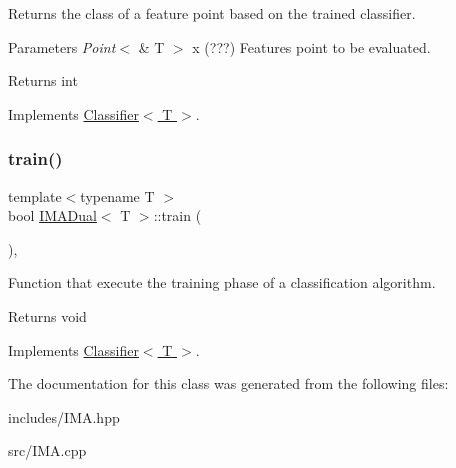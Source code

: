 Returns the class of a feature point based on the trained classifier. 


\begin{DoxyParams}{Parameters}
{\em Point$<$} & T $>$ x (???) Features point to be evaluated. \\
\hline
\end{DoxyParams}
\begin{DoxyReturn}{Returns}
int 
\end{DoxyReturn}


Implements \hyperlink{class_classifier_ab3b9544a8d9c3cbde8d5865c7e9be0fb}{Classifier$<$ T $>$}.

\mbox{\label{class_i_m_a_dual_aff820af6454ceeef4d23af48476d7218}} 
\subsubsection{\texorpdfstring{train()}{train()}}
{\footnotesize\ttfamily template$<$typename T $>$ \\
bool \hyperlink{class_i_m_a_dual}{I\+M\+A\+Dual}$<$ T $>$\+::train (\begin{DoxyParamCaption}{ }\end{DoxyParamCaption})\hspace{0.3cm}{\ttfamily [override]}, {\ttfamily [virtual]}}



Function that execute the training phase of a classification algorithm. 

\begin{DoxyReturn}{Returns}
void 
\end{DoxyReturn}


Implements \hyperlink{class_classifier_a120849bfdfa3ba7a0388b32b2d76bf4f}{Classifier$<$ T $>$}.



The documentation for this class was generated from the following files\+:\begin{DoxyCompactItemize}
\item 
includes/I\+M\+A.\+hpp\item 
src/I\+M\+A.\+cpp\end{DoxyCompactItemize}
